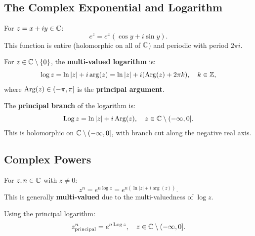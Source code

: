 \subsection{The Complex Exponential and Logarithm}

\begin{definition}
For $z = x + iy \in \mathbb{C}$:
\begin{equation}
e^z = e^x(\cos y + i \sin y).
\end{equation}
This function is entire (holomorphic on all of $\mathbb{C}$) and periodic with period $2\pi i$.
\end{definition}

\begin{definition}
For $z \in \mathbb{C} \setminus \{0\}$, the \textbf{multi-valued logarithm} is:
\begin{equation}
\log z = \ln|z| + i \arg(z) = \ln|z| + i(\operatorname{Arg}(z) + 2\pi k), \quad k \in \mathbb{Z},
\end{equation}
where $\operatorname{Arg}(z) \in (-\pi, \pi]$ is the \textbf{principal argument}.
\end{definition}

\begin{definition}
The \textbf{principal branch} of the logarithm is:
\begin{equation}
\operatorname{Log} z = \ln|z| + i\operatorname{Arg}(z), \quad z \in \mathbb{C} \setminus (-\infty, 0].
\end{equation}
This is holomorphic on $\mathbb{C} \setminus (-\infty, 0]$, with branch cut along the negative real axis.
\end{definition}

\subsection{Complex Powers}

\begin{definition}
For $z, n \in \mathbb{C}$ with $z \neq 0$:
\begin{equation}
z^n = e^{n \log z} = e^{n(\ln|z| + i\arg(z))}.
\label{eq:complex_power}
\end{equation}
This is generally \textbf{multi-valued} due to the multi-valuedness of $\log z$.
\end{definition}

\begin{definition}
Using the principal logarithm:
\begin{equation}
z^n_{\text{principal}} = e^{n \operatorname{Log} z}, \quad z \in \mathbb{C} \setminus (-\infty, 0].
\end{equation}
\end{definition}

